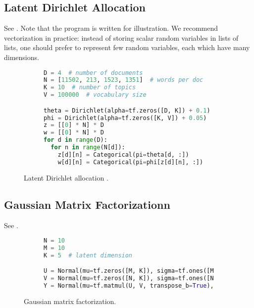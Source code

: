 \subsection{Latent Dirichlet Allocation}
\label{appendix:lda}

See . Note that the program is written for illustration. We
recommend vectorization in practice: instead of storing scalar random
variables in lists of lists, one should prefer to represent few random
variables, each which have many dimensions.

\begin{figure}[!h]
\begin{subfigure}{0.45\columnwidth}
  \centering
  
\end{subfigure}%
\begin{subfigure}{0.55\columnwidth}
\begin{lstlisting}[language=python]
D = 4  # number of documents
N = [11502, 213, 1523, 1351]  # words per doc
K = 10  # number of topics
V = 100000  # vocabulary size

theta = Dirichlet(alpha=tf.zeros([D, K]) + 0.1)
phi = Dirichlet(alpha=tf.zeros([K, V]) + 0.05)
z = [[0] * N] * D
w = [[0] * N] * D
for d in range(D):
  for n in range(N[d]):
    z[d][n] = Categorical(pi=theta[d, :])
    w[d][n] = Categorical(pi=phi[z[d][n], :])
\end{lstlisting}
\end{subfigure}
\caption{Latent Dirichlet allocation \citep{blei2003latent}.}
\label{fig:lda}
\end{figure}

\subsection{Gaussian Matrix Factorizationn}
\label{appendix:gaussian_mf}

See .


\begin{figure}[!h]
\begin{subfigure}{0.3\columnwidth}
  \centering
  
\end{subfigure}%
\begin{subfigure}{0.7\columnwidth}
\begin{lstlisting}[language=python]
N = 10
M = 10
K = 5  # latent dimension

U = Normal(mu=tf.zeros([M, K]), sigma=tf.ones([M, K]))
V = Normal(mu=tf.zeros([N, K]), sigma=tf.ones([N, K]))
Y = Normal(mu=tf.matmul(U, V, transpose_b=True), sigma=tf.ones([N, M]))
\end{lstlisting}
\end{subfigure}
\caption{Gaussian matrix factorization.}
\label{fig:gaussian_mf}
\end{figure}

